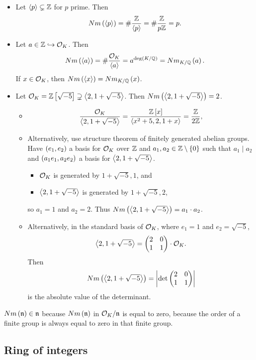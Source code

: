 \begin{example*}
\hfill
\begin{itemize}
\item Let $ \left\langle p \right\rangle \subsetneq \mathbb{Z} $ for $ p $ prime. Then
$$ Nm\left( \left\langle p \right\rangle \right) = \#\dfrac{\mathbb{Z}}{\left\langle p \right\rangle} = \#\dfrac{\mathbb{Z}}{p\mathbb{Z}} = p. $$
\item Let $ a \in \mathbb{Z} \hookrightarrow \mathcal{O}_K $. Then
$$ Nm\left( \left\langle a \right\rangle \right) = \#\dfrac{\mathcal{O}_K}{\left\langle a \right\rangle} = a^{\deg\left( K / \mathbb{Q} \right)} = Nm_{K / \mathbb{Q}}\left( a \right). $$
If $ x \in \mathcal{O}_K $, then $ Nm\left( \left\langle x \right\rangle \right) = Nm_{K / \mathbb{Q}}\left( x \right) $.
\item Let $ \mathcal{O}_K = \mathbb{Z}\left[ \sqrt{-5} \right] \supsetneq \left\langle 2, 1 + \sqrt{-5} \right\rangle $. Then $ Nm\left( \left\langle 2, 1 + \sqrt{-5} \right\rangle \right) = 2 $.
\begin{itemize}
\item
$$ \dfrac{\mathcal{O}_K}{\left\langle 2, 1 + \sqrt{-5} \right\rangle} = \dfrac{\mathbb{Z}\left[ x \right]}{\left\langle x^2 + 5, 2, 1 + x \right\rangle} = \dfrac{\mathbb{Z}}{2\mathbb{Z}}, $$
\item Alternatively, use structure theorem of finitely generated abelian groups. Have $ \left( e_1, e_2 \right) $ a basis for $ \mathcal{O}_K $ over $ \mathbb{Z} $ and $ a_1, a_2 \in \mathbb{Z} \setminus \left\{ 0 \right\} $ such that $ a_1 \mid a_2 $ and $ \left( a_1e_1, a_2e_2 \right) $ a basis for $ \left\langle 2, 1 + \sqrt{-5} \right\rangle $.
\begin{itemize}
\item $ \mathcal{O}_K $ is generated by $ 1 + \sqrt{-5}, 1 $, and
\item $ \left\langle 2, 1 + \sqrt{-5} \right\rangle $ is generated by $ 1 + \sqrt{-5}, 2 $,
\end{itemize}
so $ a_1 = 1 $ and $ a_2 = 2 $. Thus $ Nm\left( \left\langle 2, 1 + \sqrt{-5} \right\rangle \right) = a_1 \cdot a_2 $.
\item Alternatively, in the standard basis of $ \mathcal{O}_K $, where $ e_1 = 1 $ and $ e_2 = \sqrt{-5} $,
$$ \left\langle 2, 1 + \sqrt{-5} \right\rangle = \begin{pmatrix} 2 & 0 \\ 1 & 1 \end{pmatrix} \cdot \mathcal{O}_K. $$
Then
$$ Nm\left( \left\langle 2, 1 + \sqrt{-5} \right\rangle \right) = \left\lvert \det\begin{pmatrix} 2 & 0 \\ 1 & 1 \end{pmatrix} \right\rvert $$
is the absolute value of the determinant.
\end{itemize}
\end{itemize}
\end{example*}


\begin{remark*}
$ Nm\left( \mathfrak{n} \right) \in \mathfrak{n} $ because $ Nm\left( \mathfrak{n} \right) $ in $ \mathcal{O}_K / \mathfrak{n} $ is equal to zero, because the order of a finite group is always equal to zero in that finite group.
\end{remark*}

\subsection{Ring of integers}

